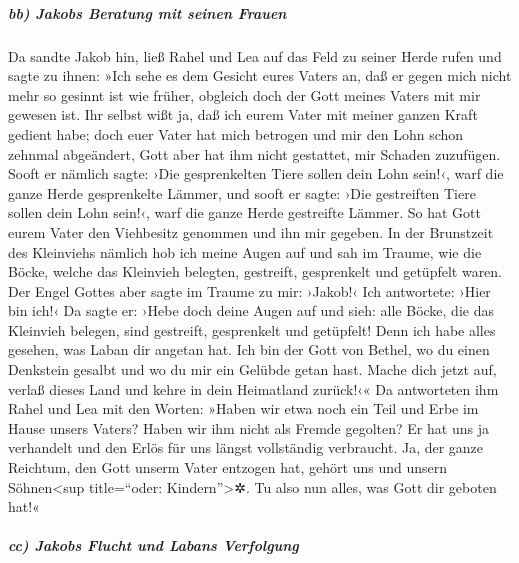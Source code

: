 \hypertarget{bb-jakobs-beratung-mit-seinen-frauen}{%
\subparagraph{bb) Jakobs Beratung mit seinen
Frauen}\label{bb-jakobs-beratung-mit-seinen-frauen}}

 Da sandte Jakob hin, ließ Rahel und Lea auf das Feld zu
seiner Herde rufen  und sagte zu ihnen: »Ich sehe es dem
Gesicht eures Vaters an, daß er gegen mich nicht mehr so gesinnt ist wie
früher, obgleich doch der Gott meines Vaters mit mir gewesen ist.
 Ihr selbst wißt ja, daß ich eurem Vater mit meiner ganzen
Kraft gedient habe;  doch euer Vater hat mich betrogen und
mir den Lohn schon zehnmal abgeändert, Gott aber hat ihm nicht
gestattet, mir Schaden zuzufügen.  Sooft er nämlich sagte:
›Die gesprenkelten Tiere sollen dein Lohn sein!‹, warf die ganze Herde
gesprenkelte Lämmer, und sooft er sagte: ›Die gestreiften Tiere sollen
dein Lohn sein!‹, warf die ganze Herde gestreifte Lämmer. 
So hat Gott eurem Vater den Viehbesitz genommen und ihn mir gegeben.
 In der Brunstzeit des Kleinviehs nämlich hob ich meine
Augen auf und sah im Traume, wie die Böcke, welche das Kleinvieh
belegten, gestreift, gesprenkelt und getüpfelt waren. 
Der Engel Gottes aber sagte im Traume zu mir: ›Jakob!‹ Ich antwortete:
›Hier bin ich!‹  Da sagte er: ›Hebe doch deine Augen auf
und sieh: alle Böcke, die das Kleinvieh belegen, sind gestreift,
gesprenkelt und getüpfelt! Denn ich habe alles gesehen, was Laban dir
angetan hat.  Ich bin der Gott von Bethel, wo du einen
Denkstein gesalbt und wo du mir ein Gelübde getan hast. Mache dich jetzt
auf, verlaß dieses Land und kehre in dein Heimatland zurück!‹«
 Da antworteten ihm Rahel und Lea mit den Worten: »Haben
wir etwa noch ein Teil und Erbe im Hause unsers Vaters? 
Haben wir ihm nicht als Fremde gegolten? Er hat uns ja verhandelt und
den Erlös für uns längst vollständig verbraucht.  Ja, der
ganze Reichtum, den Gott unserm Vater entzogen hat, gehört uns und
unsern Söhnen\textless sup title=``oder: Kindern''\textgreater✲. Tu also
nun alles, was Gott dir geboten hat!«

\hypertarget{cc-jakobs-flucht-und-labans-verfolgung}{%
\subparagraph{cc) Jakobs Flucht und Labans
Verfolgung}\label{cc-jakobs-flucht-und-labans-verfolgung}}

